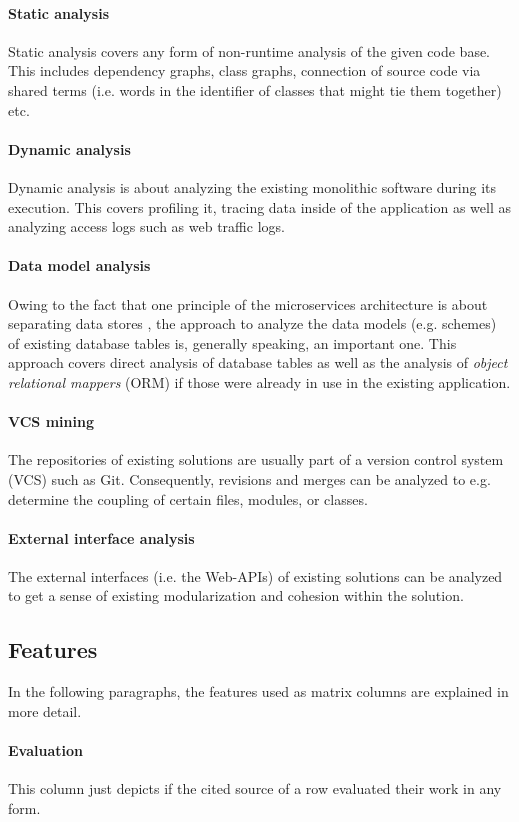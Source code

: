 \documentclass[12pt,a4paper]{report}
\begin{document}
\paragraph{Static analysis}
Static analysis covers any form of non\hyp runtime analysis of the given code base.
This includes dependency graphs, class graphs, connection of source code via shared terms
(i.e. words in the identifier of classes that might tie them together) etc.
\paragraph{Dynamic analysis}
Dynamic analysis is about analyzing the existing monolithic software during its execution.
This covers profiling it, tracing data inside of the application as well as analyzing
access logs such as web traffic logs.
\paragraph{Data model analysis}
Owing to the fact that one principle of the microservices architecture is about
separating data stores \cite{ms-microservices}, the approach to analyze
the data models (e.g. schemes) of existing database tables is, generally speaking,
an important one. This approach covers direct analysis of database tables
as well as the analysis of \textit{object relational mappers} (ORM)
if those were already in use in the existing application.
\paragraph{VCS mining}
The repositories of existing solutions are usually part of a
version control system (VCS) such as Git. Consequently, revisions and merges
can be analyzed to e.g. determine the coupling of certain files, modules, or classes.
\paragraph{External interface analysis}
The external interfaces (i.e. the Web-APIs) of existing solutions can be analyzed to get
a sense of existing modularization and cohesion within the solution.


\subsection*{Features}

In the following paragraphs, the features used as matrix columns are explained in more detail.
\paragraph{Evaluation}
This column just depicts if the cited source of a row evaluated their work in any form.
\end{document}
